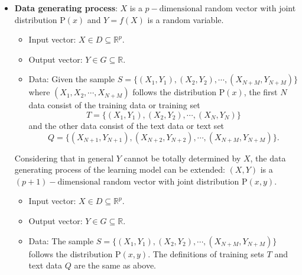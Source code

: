 \documentclass{report}
\theoremstyle{nonumberplain}
\newcommand{\0}{\mathbf{0}}
\begin{document}
\begin{itemize}
	\item \textbf{Data generating process}: $X$ is a $p-\text{dimensional}$ random vector with joint distribution $\mathrm{P}(x)$ and $Y=f(X)$ is a random variable.
	\begin{itemize}
		\item Input vector: $X\in D\subseteq\mathbb{R}^p$.
		\item Output vector: $Y\in G\subseteq\mathbb{R}$.
		\item Data: Given the sample $S=\{(X_1,Y_1),(X_2,Y_2),\cdots,(X_{N+M},Y_{N+M})\}$ where $(X_1,X_2,\cdots,X_{N+M})$ follows the distribution $\mathrm{P}(x)$, the first $N$ data consist of the training data or training set $$T=\{(X_1,Y_1),(X_2,Y_2),\cdots,(X_{N},Y_{N})\}$$
		and the other data consist of the text data or text set $$Q=\{(X_{N+1},Y_{N+1}),(X_{N+2},Y_{N+2}),\cdots,(X_{N+M},Y_{N+M})\}.$$
	\end{itemize}	

	Considering that in general $Y$ cannot be totally determined by $X$, the data generating process of the learning model can be extended: $(X,Y)$ is a $(p+1)-\text{dimensional}$ random vector with joint distribution $\mathrm{P}(x,y)$.
	\begin{itemize}
		\item Input vector: $X\in D\subseteq\mathbb{R}^p$.
		\item Output vector: $Y\in G\subseteq\mathbb{R}$.
		\item Data: The sample $S=\{(X_1,Y_1),(X_2,Y_2),\cdots,(X_{N+M},Y_{N+M})\}$ follows the distribution $\mathrm{P}(x,y)$. The definitions of training sets $T$ and text data $Q$ are the same as above.
	\end{itemize}


\end{itemize}
\end{document}
